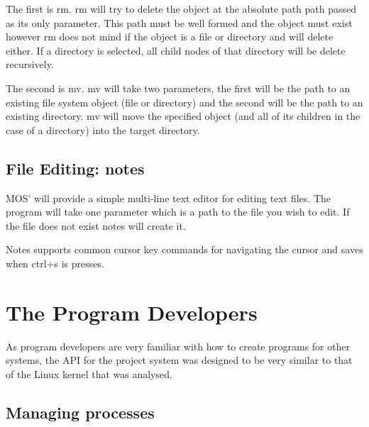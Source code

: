 \documentclass[a4paper]{report}
\begin{document}
The first is rm. rm will try to delete the object at the absolute path path passed as its only parameter. This path must be well formed and the object must exist however rm does not mind if the object is a file or directory and will delete either. If a directory is selected, all child nodes of that directory will be delete recursively.

The second is mv. mv will take two parameters, the first will be the path to an existing file system object (file or directory) and the second will be the path to an existing directory. mv will move the specified object (and all of its children in the case of a directory) into the target directory.

\subsection{File Editing: notes}

MOS' will provide a simple multi-line text editor for editing text files. The program will take one parameter which is a path to the file you wish to edit. If the file does not exist notes will create it.

Notes supports common cursor key commands for navigating the cursor and saves when ctrl+s is presses.































\section{The Program Developers}

As program developers are very familiar with how to create programs for other systems, the API for the project system was designed to be very similar to that of the Linux kernel that was analysed.

\subsection{Managing processes}
\end{document}
